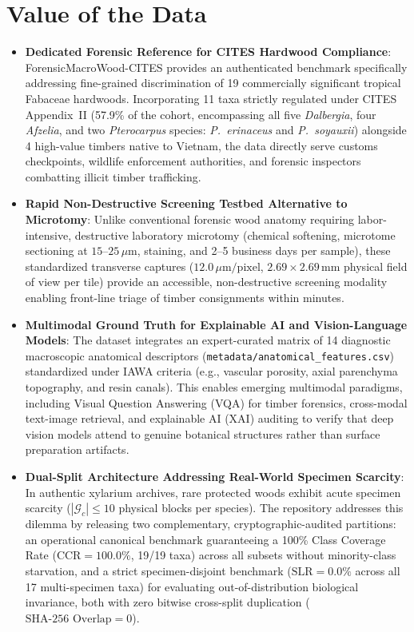 \documentclass[a4paper,fleqn,12pt]{cas-sc}
\begin{document}
\vspace{0.8em}

\section{Value of the Data}
\label{sec:value}

\begin{itemize}[leftmargin=*,itemsep=3pt,topsep=2pt]
    \item \textbf{Dedicated Forensic Reference for CITES Hardwood Compliance}: ForensicMacroWood-CITES provides an authenticated benchmark specifically addressing fine-grained discrimination of 19 commercially significant tropical Fabaceae hardwoods. Incorporating 11 taxa strictly regulated under CITES Appendix~II (57.9\% of the cohort, encompassing all five \textit{Dalbergia}, four \textit{Afzelia}, and two \textit{Pterocarpus} species: \textit{P.~erinaceus} and \textit{P.~soyauxii}) alongside 4 high-value timbers native to Vietnam, the data directly serve customs checkpoints, wildlife enforcement authorities, and forensic inspectors combatting illicit timber trafficking.
    \item \textbf{Rapid Non-Destructive Screening Testbed Alternative to Microtomy}: Unlike conventional forensic wood anatomy requiring labor-intensive, destructive laboratory microtomy (chemical softening, microtome sectioning at $15\text{--}25\,\mu\text{m}$, staining, and 2--5 business days per sample), these standardized transverse captures ($12.0\,\mu\text{m/pixel}$, $2.69 \times 2.69\,\text{mm}$ physical field of view per tile) provide an accessible, non-destructive screening modality enabling front-line triage of timber consignments within minutes.
    \item \textbf{Multimodal Ground Truth for Explainable AI and Vision-Language Models}: The dataset integrates an expert-curated matrix of 14 diagnostic macroscopic anatomical descriptors (\texttt{metadata/anatomical\_features.csv}) standardized under IAWA criteria (e.g., vascular porosity, axial parenchyma topography, and resin canals). This enables emerging multimodal paradigms, including Visual Question Answering (VQA) for timber forensics, cross-modal text-image retrieval, and explainable AI (XAI) auditing to verify that deep vision models attend to genuine botanical structures rather than surface preparation artifacts.
    \item \textbf{Dual-Split Architecture Addressing Real-World Specimen Scarcity}: In authentic xylarium archives, rare protected woods exhibit acute specimen scarcity ($|\mathcal{G}_c| \le 10$ physical blocks per species). The repository addresses this dilemma by releasing two complementary, cryptographic-audited partitions: an operational canonical benchmark guaranteeing a 100\% Class Coverage Rate ($\text{CCR} = 100.0\%$, 19/19 taxa) across all subsets without minority-class starvation, and a strict specimen-disjoint benchmark ($\text{SLR} = 0.0\%$ across all 17 multi-specimen taxa) for evaluating out-of-distribution biological invariance, both with zero bitwise cross-split duplication ($\text{SHA-256 Overlap} = 0$).

\end{itemize}
\end{document}

